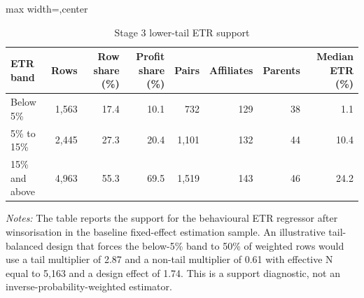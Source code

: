 \begin{table}[H]
\centering
\scriptsize
\caption{Stage 3 lower-tail ETR support}
\label{tab:app_stage3_etr_tail_support}
\begin{adjustbox}{max width=\textwidth,center}
\begin{tabular}{@{}lrrrrrrr@{}}
\toprule
ETR band & Rows & Row share (\%) & Profit share (\%) & Pairs & Affiliates & Parents & Median ETR (\%) \\
\midrule
Below 5\% & 1,563 & 17.4 & 10.1 &   732 & 129 & 38 &  1.1 \\
5\% to 15\% & 2,445 & 27.3 & 20.4 & 1,101 & 132 & 44 & 10.4 \\
15\% and above & 4,963 & 55.3 & 69.5 & 1,519 & 143 & 46 & 24.2 \\
\bottomrule
\end{tabular}
\end{adjustbox}

\vspace{0.5em}
\begin{minipage}{0.96\textwidth}
\footnotesize\raggedright \textit{Notes:} The table reports the support for the behavioural ETR regressor after winsorisation in the baseline fixed-effect estimation sample. An illustrative tail-balanced design that forces the below-5\% band to 50\% of weighted rows would use a tail multiplier of 2.87 and a non-tail multiplier of 0.61 with effective N equal to 5,163 and a design effect of 1.74. This is a support diagnostic, not an inverse-probability-weighted estimator.
\end{minipage}
\end{table}

